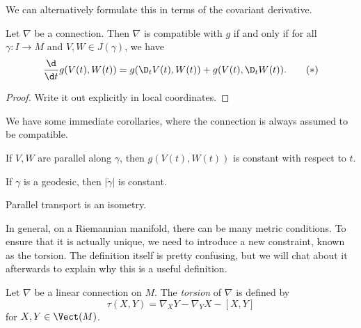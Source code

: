 \documentclass[a4paper]{article}
\begin{document}
We can alternatively formulate this in terms of the covariant derivative.
\begin{lemma}
  Let $\nabla$ be a connection. Then $\nabla$ is compatible with $g$ if and only if for all $\gamma: I \to M$ and $V, W \in J(\gamma)$, we have
  \[
    \frac{\d}{\d t}g(V(t), W(t)) = g(\D_t V(t), W(t)) + g(V(t), \D_t W(t)).\tag{$*$}
  \]
\end{lemma}

\begin{proof}
%
  Write it out explicitly in local coordinates.
\end{proof}

We have some immediate corollaries, where the connection is always assumed to be compatible.
\begin{cor}
  If $V, W$ are parallel along $\gamma$, then $g(V(t), W(t))$ is constant with respect to $t$.
\end{cor}

\begin{cor}
  If $\gamma$ is a geodesic, then $|\dot{\gamma}|$ is constant.
\end{cor}

\begin{cor}
  Parallel transport is an isometry.
\end{cor}

In general, on a Riemannian manifold, there can be many metric conditions. To ensure that it is actually unique, we need to introduce a new constraint, known as the torsion. The definition itself is pretty confusing, but we will chat about it afterwards to explain why this is a useful definition.

\begin{defi}
  Let $\nabla$ be a linear connection on $M$. The \emph{torsion} of $\nabla$ is defined by
  \[
    \tau(X, Y) = \nabla_X Y - \nabla_Y X - [X, Y]
  \]
  for $X, Y \in \Vect(M)$.
\end{defi}
\end{document}
